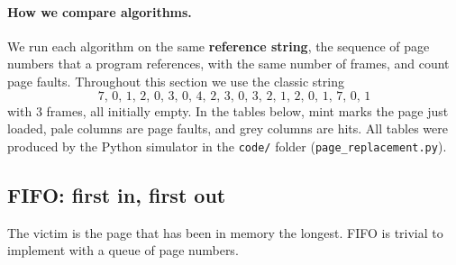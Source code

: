 \documentclass[11pt,a4paper]{article}
\newcommand{\term}[1]{\textbf{\color{mintdeep}#1}}
\newcommand{\cmd}[1]{\texttt{#1}}
\begin{document}
\paragraph{How we compare algorithms.} We run each algorithm on the same \term{reference string}, the sequence of page numbers that a program references, with the same number of frames, and count page faults. Throughout this section we use the classic string
\[
7,\,0,\,1,\,2,\,0,\,3,\,0,\,4,\,2,\,3,\,0,\,3,\,2,\,1,\,2,\,0,\,1,\,7,\,0,\,1
\]
with $3$ frames, all initially empty. In the tables below, mint marks the page just loaded, pale columns are page faults, and grey columns are hits. All tables were produced by the Python simulator in the \texttt{code/} folder (\cmd{page\_replacement.py}).

\subsection{FIFO: first in, first out}

The victim is the page that has been in memory the longest. FIFO is trivial to implement with a queue of page numbers.
\end{document}
